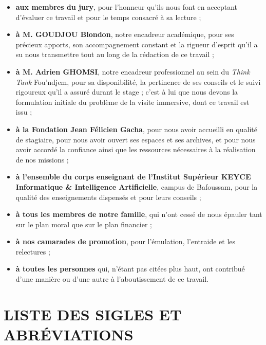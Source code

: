 \begin{itemize}
  \item \textbf{aux membres du jury}, pour l'honneur qu'ils nous font en
        acceptant d'évaluer ce travail et pour le temps consacré à sa lecture ;

  \item \textbf{à M. GOUDJOU Blondon}, notre encadreur académique, pour ses
        précieux apports, son accompagnement constant et la rigueur d'esprit
        qu'il a su nous transmettre tout au long de la rédaction de ce travail ;

  \item \textbf{à M. Adrien GHOMSI}, notre encadreur professionnel au sein du
        \emph{Think Tank} Fou'ndjem, pour sa disponibilité, la pertinence de ses
        conseils et le suivi rigoureux qu'il a assuré durant le stage ; c'est à
        lui que nous devons la formulation initiale du problème de la visite
        immersive, dont ce travail est issu ;

  \item \textbf{à la Fondation Jean Félicien Gacha}, pour nous avoir accueilli
        en qualité de stagiaire, pour nous avoir ouvert ses espaces et ses
        archives, et pour nous avoir accordé la confiance ainsi que les
        ressources nécessaires à la réalisation de nos missions ;

  \item \textbf{à l'ensemble du corps enseignant de l'Institut Supérieur KEYCE
        Informatique \& Intelligence Artificielle}, campus de Bafoussam, pour
        la qualité des enseignements dispensés et pour leurs conseils ;

  \item \textbf{à tous les membres de notre famille}, qui n'ont cessé de nous
        épauler tant sur le plan moral que sur le plan financier ;

  \item \textbf{à nos camarades de promotion}, pour l'émulation, l'entraide et
        les relectures ;

  \item \textbf{à toutes les personnes} qui, n'étant pas citées plus haut, ont
        contribué d'une manière ou d'une autre à l'aboutissement de ce travail.
\end{itemize}

\cleardoublepage
{}
\chapter*{LISTE DES SIGLES ET ABRÉVIATIONS}

